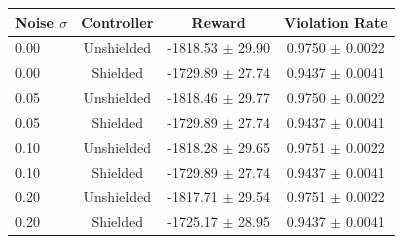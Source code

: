 \footnotesize
\setlength{\tabcolsep}{5pt}
\begin{tabular}{lccc}
\toprule
Noise $\sigma$ & Controller & Reward & Violation Rate \\
\midrule
0.00 & Unshielded & -1818.53 $\pm$ 29.90 & 0.9750 $\pm$ 0.0022 \\
0.00 & Shielded & -1729.89 $\pm$ 27.74 & 0.9437 $\pm$ 0.0041 \\
0.05 & Unshielded & -1818.46 $\pm$ 29.77 & 0.9750 $\pm$ 0.0022 \\
0.05 & Shielded & -1729.89 $\pm$ 27.74 & 0.9437 $\pm$ 0.0041 \\
0.10 & Unshielded & -1818.28 $\pm$ 29.65 & 0.9751 $\pm$ 0.0022 \\
0.10 & Shielded & -1729.89 $\pm$ 27.74 & 0.9437 $\pm$ 0.0041 \\
0.20 & Unshielded & -1817.71 $\pm$ 29.54 & 0.9751 $\pm$ 0.0022 \\
0.20 & Shielded & -1725.17 $\pm$ 28.95 & 0.9437 $\pm$ 0.0041 \\
\bottomrule
\end{tabular}
